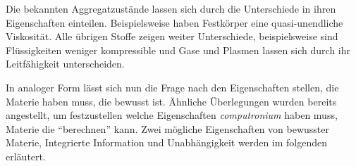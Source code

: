 
Die bekannten Aggregatzustände lassen sich durch die Unterschiede in ihren Eigenschaften einteilen.
Beispielsweise haben Festkörper eine quasi-unendliche Viskosität. Alle übrigen Stoffe zeigen weiter Unterschiede,
beispielsweise sind Flüssigkeiten weniger kompressible und Gase und Plasmen lassen sich durch ihr
Leitfähigkeit unterscheiden. 

In analoger Form lässt sich nun die Frage nach den Eigenschaften stellen, die Materie haben muss, 
die bewusst ist. Ähnliche Überlegungen wurden bereits angestellt, um festzustellen welche Eigenschaften 
\emph{computronium} haben muss, Materie die \enquote{berechnen} kann.
Zwei mögliche Eigenschaften von bewusster Materie, Integrierte Information und Unabhängigkeit werden im 
folgenden erläutert.

